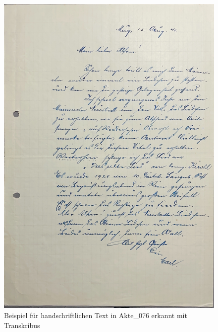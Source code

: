 \documentclass[12pt, a4paper, ngerman, bidi=default]{article}
\begin{document}
    \begin{figure}[htbp]
      \centering
      \includegraphics[width=\textwidth]{./assets/Images/Akte_076_S001.jpg}
      \caption{Beispiel für handschriftlichen Text in Akte\_076 erkannt mit Transkribus}
      \label{fig:transkribus-handschrift}
    \end{figure}
\end{document}
